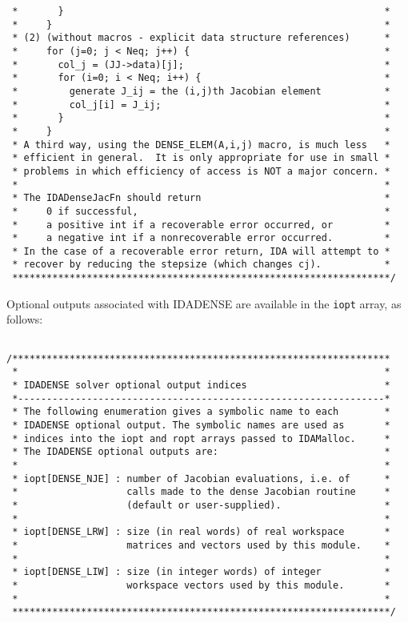 \begin{verbatim}
 *       }                                                        *
 *     }                                                          *
 * (2) (without macros - explicit data structure references)      *
 *     for (j=0; j < Neq; j++) {                                  *
 *       col_j = (JJ->data)[j];                                   *
 *       for (i=0; i < Neq; i++) {                                *
 *         generate J_ij = the (i,j)th Jacobian element           *
 *         col_j[i] = J_ij;                                       *
 *       }                                                        *
 *     }                                                          *
 * A third way, using the DENSE_ELEM(A,i,j) macro, is much less   *
 * efficient in general.  It is only appropriate for use in small *
 * problems in which efficiency of access is NOT a major concern. *
 *                                                                *
 * The IDADenseJacFn should return                                *
 *     0 if successful,                                           *
 *     a positive int if a recoverable error occurred, or         *
 *     a negative int if a nonrecoverable error occurred.         *
 * In the case of a recoverable error return, IDA will attempt to *
 * recover by reducing the stepsize (which changes cj).           *
 ******************************************************************/

\end{verbatim}
\normalsize

Optional outputs associated with IDADENSE are available in the 
{\tt iopt} array, as follows:

\small
\begin{verbatim}
 
/******************************************************************
 *                                                                *
 * IDADENSE solver optional output indices                        *
 *----------------------------------------------------------------*
 * The following enumeration gives a symbolic name to each        *
 * IDADENSE optional output. The symbolic names are used as       *
 * indices into the iopt and ropt arrays passed to IDAMalloc.     *
 * The IDADENSE optional outputs are:                             *
 *                                                                *
 * iopt[DENSE_NJE] : number of Jacobian evaluations, i.e. of      *
 *                   calls made to the dense Jacobian routine     *
 *                   (default or user-supplied).                  *
 *                                                                *
 * iopt[DENSE_LRW] : size (in real words) of real workspace       *
 *                   matrices and vectors used by this module.    *
 *                                                                *
 * iopt[DENSE_LIW] : size (in integer words) of integer           *
 *                   workspace vectors used by this module.       *
 *                                                                *
 ******************************************************************/

\end{verbatim}
\normalsize
 

